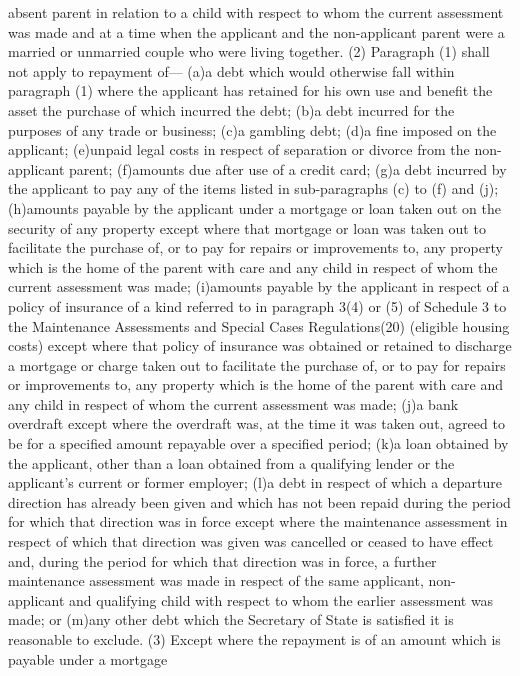 \documentclass[a4paper]{article}
\begin{document}
absent parent in relation to a child with respect to whom the current assessment
was made and at a time when the applicant and the non-applicant parent were a
married or unmarried couple who were living together.
(2) Paragraph (1) shall not apply to repayment of—
(a)a debt which would otherwise fall within paragraph (1) where the applicant
has retained for his own use and benefit the asset the purchase of which
incurred the debt;
(b)a debt incurred for the purposes of any trade or business;
(c)a gambling debt;
(d)a fine imposed on the applicant;
(e)unpaid legal costs in respect of separation or divorce from the non-applicant
parent;
(f)amounts due after use of a credit card;
(g)a debt incurred by the applicant to pay any of the items listed in
sub-paragraphs (c) to (f) and (j);
(h)amounts payable by the applicant under a mortgage or loan taken out on the
security of any property except where that mortgage or loan was taken out to
facilitate the purchase of, or to pay for repairs or improvements to, any
property which is the home of the parent with care and any child in respect of
whom the current assessment was made;
(i)amounts payable by the applicant in respect of a policy of insurance of a
kind referred to in paragraph 3(4) or (5) of Schedule 3 to the Maintenance
Assessments and Special Cases Regulations(20) (eligible housing costs) except
where that policy of insurance was obtained or retained to discharge a mortgage
or charge taken out to facilitate the purchase of, or to pay for repairs or
improvements to, any property which is the home of the parent with care and any
child in respect of whom the current assessment was made;
(j)a bank overdraft except where the overdraft was, at the time it was taken
out, agreed to be for a specified amount repayable over a specified period;
(k)a loan obtained by the applicant, other than a loan obtained from a
qualifying lender or the applicant’s current or former employer;
(l)a debt in respect of which a departure direction has already been given and
which has not been repaid during the period for which that direction was in
force except where the maintenance assessment in respect of which that direction
was given was cancelled or ceased to have effect and, during the period for
which that direction was in force, a further maintenance assessment was made in
respect of the same applicant, non-applicant and qualifying child with respect
to whom the earlier assessment was made; or
(m)any other debt which the Secretary of State is satisfied it is reasonable to
exclude.
(3) Except where the repayment is of an amount which is payable under a mortgage
\end{document}
